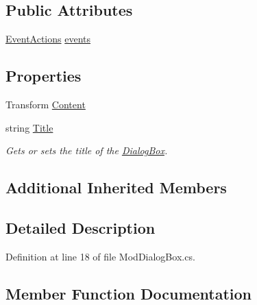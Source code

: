 \subsection*{Public Attributes}
\begin{DoxyCompactItemize}
\item 
\hyperlink{class_event_actions}{Event\+Actions} \hyperlink{class_mod_dialog_box_a3c813d099152381e26ab8c9e69b20ae4}{events}
\end{DoxyCompactItemize}
\subsection*{Properties}
\begin{DoxyCompactItemize}
\item 
Transform \hyperlink{class_mod_dialog_box_a72b137b52209ada16e47f31315d344d0}{Content}
\item 
string \hyperlink{class_mod_dialog_box_a5e7896ddc71e02f671cddd75cf65bdc6}{Title}
\begin{DoxyCompactList}\small\item\em Gets or sets the title of the \hyperlink{class_dialog_box}{Dialog\+Box}. \end{DoxyCompactList}\end{DoxyCompactItemize}
\subsection*{Additional Inherited Members}


\subsection{Detailed Description}


Definition at line 18 of file Mod\+Dialog\+Box.\+cs.



\subsection{Member Function Documentation}
\mbox{\label{class_mod_dialog_box_ac69e09264e0a4f6bef17266cc851b57a}} 
